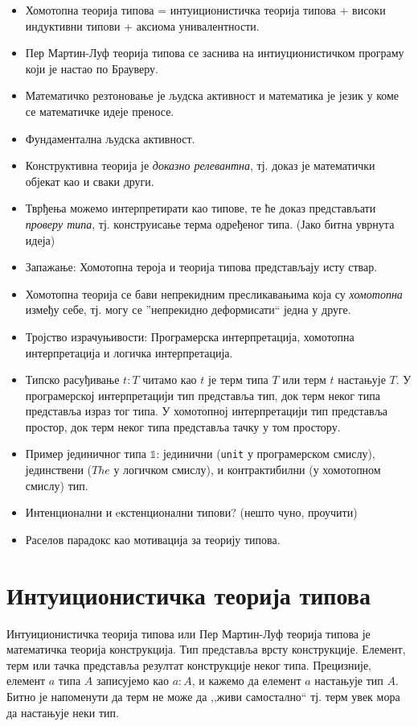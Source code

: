 \documentclass[12pt,oneside]{memoir}
\begin{document}
\begin{itemize}
    \item{Хомотопна теорија типова = интуиционистичка теорија типова + високи индуктивни типови + аксиома унивалентности.}
    \item{Пер Мартин-Луф теорија типова се заснива на интиуционистичком програму који је настао по Брауверу.}
    \item{Математичко резтоновање је људска активност и математика је језик у коме се математичке идеје преносе.}
    \item{Фундаментална људска активност.}
    \item{Конструктивна теорија је \textit{доказно релевантна}, тј. доказ је математички објекат као и сваки други.}
    \item{Тврђења можемо интерпретирати као типове, те ће доказ представљати \textit{проверу типа}, тј. конструисање терма одређеног типа. (Јако битна уврнута идеја)}
    \item{Запажање: Хомотопна тероја и теорија типова представљају исту ствар.}
    \item{Хомотопна теорија се бави непрекидним пресликавањима која су \textit{хомотопна} између себе, тј. могу се ''непрекидно деформисати`` једна у друге.}
    \item{Тројство израчуњивости: Програмерска интерпретација, хомотопна интерпретација и логичка интерпретација.}
    \item{Типско расуђивање $t : T$ читамо као $t$ је терм типа $T$ или терм $t$ настањује $T$. У програмерској интерпретацији тип представља тип, док терм неког типа представља израз тог типа. У хомотопној интерпретацији тип представља простор, док терм неког типа представља тачку у том простору.}
    \item{Пример јединичног типа $\mathbb{1}$: јединични (\texttt{unit} у програмерском смислу), јединствени ($The$ у логичком смислу), и контрактибилни (у хомотопном смислу) тип.}
    \item{Интенционални и eкстенционални типови? (нешто чуно, проучити)}
    \item{Раселов парадокс као мотивација за теорију типова.}
\end{itemize}

\chapter{Интуиционистичка теорија типова}

Интуиционистичка теорија типова или Пер Мартин-Луф теорија типова је математичка теорија конструкција. Тип представља врсту конструкције. Елемент, терм или тачка представља резултат конструкције неког типа. Прецизније, елемент $a$ типа $A$ записујемо као $a : A$, и кажемо да елемент $a$ настањује тип $A$. Битно је напоменути да терм не може да ,,живи самостално`` тј. терм увек мора да настањује неки тип. 
\end{document}
